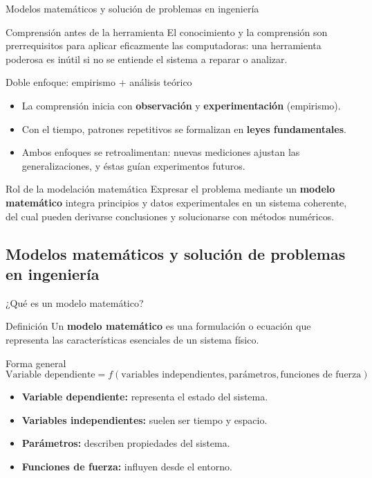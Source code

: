 \documentclass[main.tex]{subfiles}
\begin{document}
\begin{frame}[c]{Modelos matemáticos y solución de problemas en ingeniería}
\footnotesize
\begin{block}{Comprensión antes de la herramienta}
\vspace{0.2cm}
El conocimiento y la comprensión son prerrequisitos para aplicar eficazmente las computadoras: una herramienta poderosa es inútil si no se entiende el sistema a reparar o analizar.
\end{block}

\begin{block}{Doble enfoque: empirismo + análisis teórico}
\begin{itemize}
  \item La comprensión inicia con \textbf{observación} y \textbf{experimentación} (empirismo).
  \item Con el tiempo, patrones repetitivos se formalizan en \textbf{leyes fundamentales}.
  \item Ambos enfoques se retroalimentan: nuevas mediciones ajustan las generalizaciones, y éstas guían experimentos futuros.
\end{itemize}
\end{block}

\begin{block}{Rol de la modelación matemática}
\medskip
Expresar el problema mediante un \textbf{modelo matemático} integra principios y datos experimentales en un sistema coherente, del cual pueden derivarse conclusiones y solucionarse con métodos numéricos.
\end{block}
\end{frame}

\subsection{Modelos matemáticos y solución de problemas en ingeniería}
\begin{frame}[c]{¿Qué es un modelo matemático?}
\begin{block}{Definición}
\medskip
Un \textbf{modelo matemático} es una formulación o ecuación que representa las características esenciales de un sistema físico.
\end{block}
\begin{block}{Forma general}
\[
\text{Variable dependiente} = f(\text{variables independientes}, \text{parámetros}, \text{funciones de fuerza})
\]
\begin{itemize}
  \item \textbf{Variable dependiente:} representa el estado del sistema.
  \item \textbf{Variables independientes:} suelen ser tiempo y espacio.
  \item \textbf{Parámetros:} describen propiedades del sistema.
  \item \textbf{Funciones de fuerza:} influyen desde el entorno.
\end{itemize}
\end{block}
\end{frame}
\end{document}

